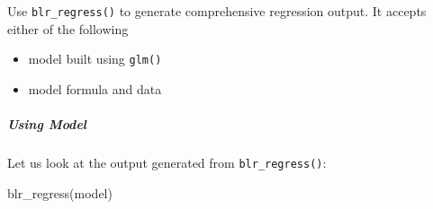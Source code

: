 \documentclass[
]{article}
\newenvironment{Shaded}{\begin{snugshade}}{\end{snugshade}}
\newcommand{\FunctionTok}[1]{\textcolor[rgb]{0.00,0.00,0.00}{#1}}
\newcommand{\NormalTok}[1]{#1}
\providecommand{\tightlist}{%
  \setlength{\itemsep}{0pt}\setlength{\parskip}{0pt}}
\begin{document}
Use \texttt{blr\_regress()} to generate comprehensive regression output.
It accepts either of the following

\begin{itemize}
\tightlist
\item
  model built using \texttt{glm()}
\item
  model formula and data
\end{itemize}

\hypertarget{using-model}{%
\subparagraph{Using Model}\label{using-model}}

Let us look at the output generated from \texttt{blr\_regress()}:

\begin{Shaded}
\begin{Highlighting}[]
\FunctionTok{blr\_regress}\NormalTok{(model)}
\end{Highlighting}
\end{Shaded}
\end{document}
